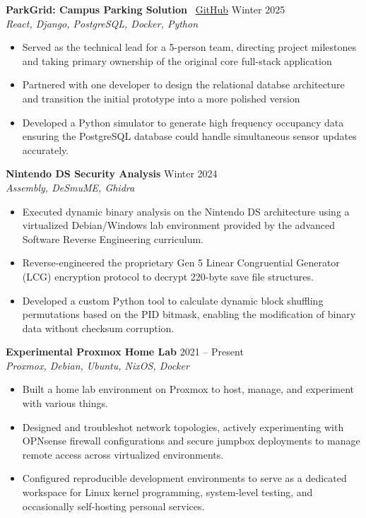 \documentclass[10pt]{article}
\begin{document}
\vspace{3pt}


\textbf{ParkGrid: Campus Parking Solution} \textbullet \ \href{https://github.com/jmtorr3/smart-parking}{GitHub} \hfill Winter 2025 \\
\textit{React, Django, PostgreSQL, Docker, Python}
\begin{itemize}[noitemsep, topsep=0pt, partopsep=0pt, parsep=0pt]
  \item Served as the technical lead for a 5-person team, directing project milestones and taking primary ownership of the original core full-stack application
  \item Partnered with one developer to design the relational databse architecture and transition the initial prototype into a more polished version
  \item Developed a Python simulator to generate high frequency occupancy data ensuring the PostgreSQL database could handle simultaneous sensor updates accurately.
\end{itemize}

\vspace{3pt}

\textbf{Nintendo DS Security Analysis} \hfill Winter 2024 \\
\textit{Assembly, DeSmuME, Ghidra}
\begin{itemize}[noitemsep, topsep=0pt, partopsep=0pt, parsep=0pt]
    \item Executed dynamic binary analysis on the Nintendo DS architecture using a virtualized Debian/Windows lab environment provided by the advanced Software Reverse Engineering curriculum.
    \item Reverse-engineered the proprietary Gen 5 Linear Congruential Generator (LCG) encryption protocol to decrypt 220-byte save file structures.
    \item Developed a custom Python tool to calculate dynamic block shuffling permutations based on the PID bitmask, enabling the modification of binary data without checksum corruption.
\end{itemize}

\vspace{3pt}

\textbf{Experimental Proxmox Home Lab} \hfill 2021 -- Present \\
\textit{Proxmox, Debian, Ubuntu, NixOS, Docker}
\begin{itemize}[noitemsep, topsep=0pt, partopsep=0pt, parsep=0pt]
  \item Built a home lab environment on Proxmox to host, manage, and experiment with various things.
  \item Designed and troubleshot network topologies, actively experimenting with OPNsense firewall configurations and secure jumpbox deployments to manage remote access across virtualized environments.
  \item Configured reproducible development environments to serve as a dedicated workspace for Linux kernel programming, system-level testing, and occasionally self-hosting personal services.
\end{itemize}
\end{document}
